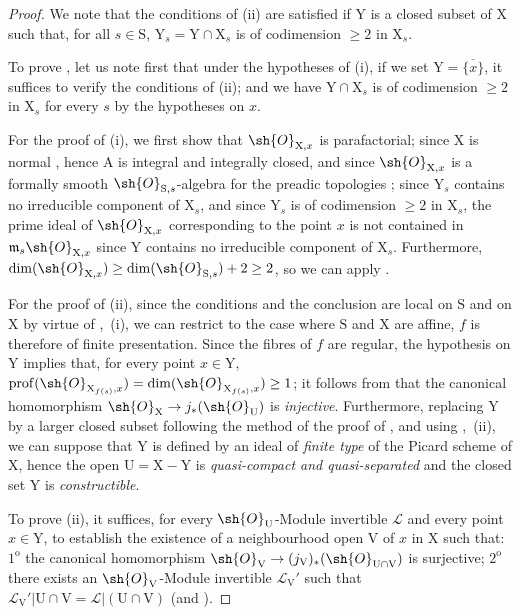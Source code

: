 \begin{proof}
We note that the conditions of (ii) are satisfied if $\mathrm{Y}$ is a closed subset of $\mathrm{X}$ such that, for all $s\in\mathrm{S}$, $\mathrm{Y}_s=\mathrm{Y}\cap\mathrm{X}_s$ is of codimension $\geq 2$ in $\mathrm{X}_s$.

To prove , let us note first that under the hypotheses of (i), if we set $\mathrm{Y}=\overline{\{x\}}$, it suffices to verify the conditions of (ii); and we have $\mathrm{Y}\cap\mathrm{X}_s$ is of codimension $\geq 2$ in $\mathrm{X}_s$ for every $s$ by the hypotheses on $x$.

For the proof of (i), we first show that $\sh{O}_{\mathrm{X},x}$ is parafactorial; since $\mathrm{X}$ is normal , hence $\mathrm{A}$ is integral and integrally closed, and since $\sh{O}_{\mathrm{X},x}$ is a formally smooth $\sh{O}_{\mathrm{S},s}$-algebra for the preadic topologies ; since $\mathrm{Y}_s$ contains no irreducible component of $\mathrm{X}_s$, and since $\mathrm{Y}_s$ is of codimension $\geq 2$ in $\mathrm{X}_s$, the prime ideal of $\sh{O}_{\mathrm{X},x}$ corresponding to the point $x$ is not contained in $\mathfrak{m}_s\sh{O}_{\mathrm{X},x}$ since $\mathrm{Y}$ contains no irreducible component of $\mathrm{X}_s$.
Furthermore, $\dim(\sh{O}_{\mathrm{X},x})\geq\dim(\sh{O}_{\mathrm{S},s})+2\geq 2$, so we can apply .

For the proof of (ii), since the conditions and the conclusion are local on $\mathrm{S}$ and on $\mathrm{X}$ by virtue of ,~(i), we can restrict to the case where $\mathrm{S}$ and $\mathrm{X}$ are affine, $f$ is therefore of finite presentation.
Since the fibres of $f$ are regular, the hypothesis on $\mathrm{Y}$ implies that, for every point $x\in\mathrm{Y}$, $\operatorname{prof}(\sh{O}_{\mathrm{X}_{f(s)},x})=\dim(\sh{O}_{\mathrm{X}_{f(s)},x})\geq 1$; it follows from  that the canonical homomorphism $\sh{O}_{\mathrm{X}}\to j_*(\sh{O}_{\mathrm{U}})$ is \emph{injective}.
Furthermore, replacing $\mathrm{Y}$ by a larger closed subset following the method of the proof of , and using ,~(ii), we can suppose that $\mathrm{Y}$ is defined by an ideal of \emph{finite type} of the Picard scheme of $\mathrm{X}$, hence the open $\mathrm{U}=\mathrm{X}-\mathrm{Y}$ is \emph{quasi-compact and quasi-separated} and the closed set $\mathrm{Y}$ is \emph{constructible}.

To prove (ii), it suffices, for every $\sh{O}_{\mathrm{U}}$-Module invertible $\mathscr{L}$ and every point $x\in\mathrm{Y}$, to establish the existence of a neighbourhood open $\mathrm{V}$ of $x$ in $\mathrm{X}$ such that: $1^{\mathrm{o}}$ the canonical homomorphism $\sh{O}_{\mathrm{V}}\to(j_{\mathrm{V}})_*(\sh{O}_{\mathrm{U}\cap\mathrm{V}})$ is surjective; $2^{\mathrm{o}}$ there exists an $\sh{O}_{\mathrm{V}}$-Module invertible $\mathscr{L}_{\mathrm{V}}'$ such that $\mathscr{L}_{\mathrm{V}}'|\mathrm{U}\cap\mathrm{V}=\mathscr{L}|(\mathrm{U}\cap\mathrm{V})$ (and ).


\end{proof}
